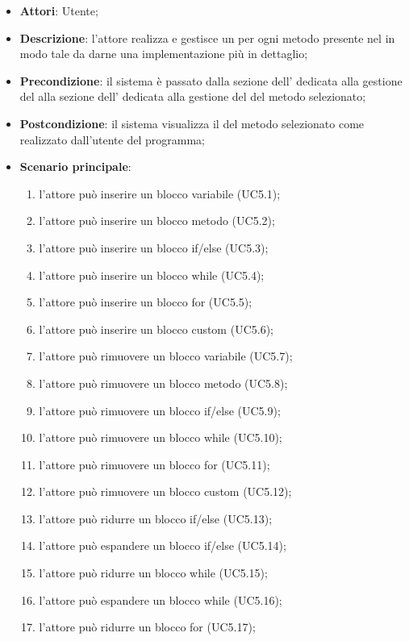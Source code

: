 \begin{itemize}
\item \textbf{Attori}: Utente;
\item \textbf{Descrizione}: l'attore realizza e gestisce un  per ogni metodo presente nel  in modo tale da darne una implementazione più in dettaglio;	
\item \textbf{Precondizione}: il sistema è passato dalla sezione dell' dedicata alla gestione del  alla sezione dell' dedicata alla gestione del  del metodo selezionato;	
\item \textbf{Postcondizione}: il sistema visualizza il  del metodo selezionato come realizzato dall'utente del programma;
\item \textbf{Scenario principale}:
\begin{enumerate}
\item l'attore può inserire un blocco variabile (UC5.1);
\item l'attore può inserire un blocco metodo (UC5.2);
\item l'attore può inserire un blocco if/else (UC5.3);
\item l'attore può inserire un blocco while (UC5.4);
\item l'attore può inserire un blocco for (UC5.5);
\item l'attore può inserire un blocco custom (UC5.6);
\item l'attore può rimuovere un blocco variabile (UC5.7);
\item l'attore può rimuovere un blocco metodo (UC5.8);
\item l'attore può rimuovere un blocco if/else (UC5.9);
\item l'attore può rimuovere  un blocco while (UC5.10);
\item l'attore può rimuovere un blocco for (UC5.11);
\item l'attore può rimuovere un blocco custom (UC5.12);
\item l'attore può ridurre un blocco if/else (UC5.13);
\item l'attore può espandere un blocco if/else (UC5.14);
\item l'attore può ridurre un blocco while (UC5.15);
\item l'attore può espandere un blocco while (UC5.16);
\item l'attore può ridurre un blocco for (UC5.17);

\end{enumerate}
\end{itemize}
